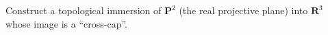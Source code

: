Construct a topological immersion of $\mathbf{P}^2$ (the real projective plane) into $\mathbf{R}^3$ whose image is a ``cross-cap''.
